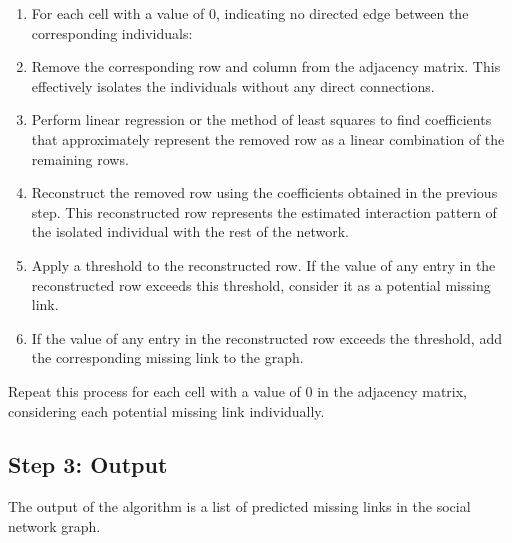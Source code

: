 \documentclass{article}
\begin{document}
    
    \begin{enumerate}
    \item For each cell with a value of 0, indicating no directed edge between the corresponding individuals:
        \item Remove the corresponding row and column from the adjacency matrix. This effectively isolates the individuals without any direct connections.
        \item Perform linear regression or the method of least squares to find coefficients that approximately represent the removed row as a linear combination of the remaining rows.
        \item Reconstruct the removed row using the coefficients obtained in the previous step. This reconstructed row represents the estimated interaction pattern of the isolated individual with the rest of the network.
        \item Apply a threshold to the reconstructed row. If the value of any entry in the reconstructed row exceeds this threshold, consider it as a potential missing link.
        \item If the value of any entry in the reconstructed row exceeds the threshold, add the corresponding missing link to the graph.
    \end{enumerate}
    \item Repeat this process for each cell with a value of 0 in the adjacency matrix, considering each potential missing link individually.


\subsection{Step 3: Output}

The output of the algorithm is a list of predicted missing links in the social network graph.
\end{document}
